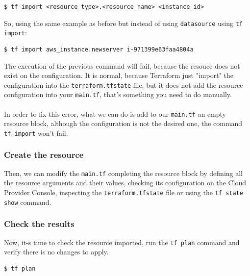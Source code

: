 \documentclass{article}
\newenvironment{blocktemplateIII}[1]{%
    \tcolorbox[beamer,%
    noparskip,breakable,
    ,colframe=Red,%
    colbacklower=LimeGreen!75!LightGreen,%
    title=#1]}%
    {\endtcolorbox}
\newenvironment{codetemplate}[1][]{%
  \mybasecolorbox[#1]
  \itshape
}{%
  \endmybasecolorbox
}
\begin{document}
\begin{codetemplate}{}
\begin{verbatim}
$ tf import <resource_type>.<resource_name> <instance_id>
\end{verbatim}
\end{codetemplate}

So, using the same example as before but instead of using \verb|datasource| using \verb|tf import|:
\begin{codetemplate}{}
\begin{verbatim}
$ tf import aws_instance.newserver i-971399e63faa4804a
\end{verbatim}
\end{codetemplate}

\begin{blocktemplateIII}{WARNING}
The execution of the previous command will fail, because the resouce does not exist on the configuration. It is normal, because Terraform just "import" the configuration into the \verb|terraform.tfstate| file, but it does not add the resource configuration into your \verb|main.tf|, that's something you need to do manually.
\\\\
In order to fix this error, what we can do is add to our \verb|main.tf| an empty resource block, although the configuration is not the desired one, the command \verb|tf import| won't fail.
\end{blocktemplateIII}

\subsubsection{Create the resource}

Then, we can modify the \verb|main.tf| completing the resource block by defining all the resource arguments and their values, checking its configuration on the Cloud Provider Console, inspecting the \verb|terraform.tfstate| file or using the \verb|tf state show| command. 

\subsubsection{Check the results}
Now, it-s time to check the resource imported, run the \verb|tf plan| command and verify there is no changes to apply.

\begin{codetemplate}{}
\begin{verbatim}
$ tf plan
\end{verbatim}
\end{codetemplate}
\end{document}
